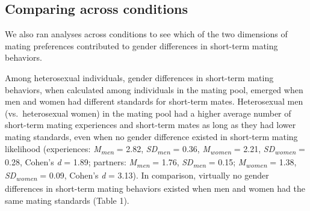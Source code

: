 \documentclass[
  11pt,
]{article}
\begin{document}
\hypertarget{comparing-across-conditions}{%
\subsection{Comparing across
conditions}\label{comparing-across-conditions}}

We also ran analyses across conditions to see which of the two
dimensions of mating preferences contributed to gender differences in
short-term mating behaviors.

Among heterosexual individuals, gender differences in short-term mating
behaviors, when calculated among individuals in the mating pool, emerged
when men and women had different standards for short-term mates.
Heterosexual men (vs.~heterosexual women) in the mating pool had a
higher average number of short-term mating experiences and short-term
mates as long as they had lower mating standards, even when no gender
difference existed in short-term mating likelihood (experiences:
\emph{M\textsubscript{men}} = 2.82, \emph{SD\textsubscript{men}} = 0.36,
\emph{M\textsubscript{women}} = 2.21, \emph{SD\textsubscript{women}} =
0.28, Cohen's \emph{d} = 1.89; partners: \emph{M\textsubscript{men}} =
1.76, \emph{SD\textsubscript{men}} = 0.15; \emph{M\textsubscript{women}}
= 1.38, \emph{SD\textsubscript{women}} = 0.09, Cohen's \emph{d} = 3.13).
In comparison, virtually no gender differences in short-term mating
behaviors existed when men and women had the same mating standards
(Table 1).
\end{document}
